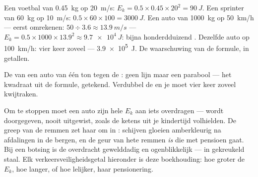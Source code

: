 \begin{example}\label{ex:g9:kinetic-energy-safety:first}
Een voetbal van \qty{0.45}{kg} op \qty{20}{m/s}: $E_k = 0.5 \times
0.45 \times 20^2 = \qty{90}{J}$. Een sprinter van \qty{60}{kg} op
\qty{10}{m/s}: $0.5 \times 60 \times 100 = \qty{3000}{J}$. Een auto van
\qty{1000}{kg} op \qty{50}{km/h} --- eerst omrekenen: $50 \div 3.6
\approx \qty{13.9}{m/s}$ --- $E_k = 0.5 \times 1000 \times 13.9^2
\approx \qty{9.7e4}{J}$: bijna honderdduizend . Dezelfde
auto op \qty{100}{km/h}: vier keer zoveel --- \qty{3.9e5}{J}. De
waarschuwing van de formule, in getallen.
\end{example}

\begin{omfigure}

{\small De  van een auto van één ton tegen de
: geen lijn maar een parabool --- het kwadraat uit de
formule, getekend. Verdubbel de  en je moet vier keer
zoveel  kwijtraken.}
\end{omfigure}

\begin{example}\label{ex:g9:kinetic-energy-safety:brakes}
Om te stoppen moet een auto zijn hele $E_k$ aan iets overdragen ---
 wordt doorgegeven, nooit uitgewist, zoals de ketens uit
je kindertijd volhielden. De greep van de remmen zet haar om in
: schijven gloeien amberkleurig na afdalingen in de
bergen, en de geur van hete remmen \emph{is} 
die met pensioen gaat. Bij een botsing is de overdracht gewelddadig en
ogenblikkelijk --- in gekreukeld staal. Elk verkeersveiligheidsgetal
hieronder is deze boekhouding: hoe groter de $E_k$, hoe langer, of hoe
lelijker, haar pensionering.
\end{example}

